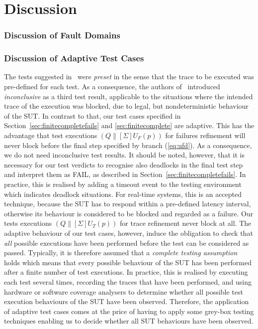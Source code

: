 \section{Discussion}
\label{sec:conc}
\subsubsection*{Discussion of Fault Domains}

\subsubsection*{Discussion of Adaptive Test Cases}
The tests suggested 
in~\cite{Hennessy:1988:ATP:50497,DBLP:conf/icfem/CavalcantiG07} were \emph{preset} in the
sense that the trace to be executed was pre-defined for each test. As a consequence,
the authors of~\cite{DBLP:conf/icfem/CavalcantiG07} introduced \emph{inconclusive}
as a third test result, applicable to the situations where the intended trace
of the execution was blocked, due to legal, but nondeterministic behaviour of the
SUT. In contrast to that, 
our test cases
specified in Section~\ref{sec:finitecompletefails} and \ref{sec:finitecomplete} are
adaptive. This has the advantage that test executions $(Q\parallel[\Sigma] U_F(p))$
for failures refinement
will never block before the final step specified by branch (\ref{eq:ufd}). As
a consequence, we do not need inconclusive test results. It should be noted, however,
that it is necessary for our test verdicts to recognise also deadlocks in the final
test step and interpret 
them as FAIL, as described in Section~\ref{sec:finitecompletefails}. In practice,
this is realised by adding a timeout event to the testing environment which indicates
deadlock situations. For real-time systems, this is an accepted technique, because
the SUT has to respond within a pre-defined latency interval, otherwise its behaviour 
is considered to be blocked and regarded as a failure. Our tests executions 
$(Q\parallel[\Sigma] U_T(p))$ for trace refinement never block at all. The adaptive       
behaviour of our test cases, however, induce the obligation to check that {\it all}
possible executions have been performed before the test can be considered as passed.
Typically, it is therefore assumed that a 
\emph{complete testing assumption}~\cite{hierons_testing_2004} holds which means that
every possible behaviour of the SUT has been performed after a finite number of
test executions. 
In practice, this is realised by executing each test several times, 
recording the traces that have been performed, and using hardware or software coverage 
analysers to determine whether all possible test execution behaviours of the SUT
have been observed. Therefore, the application of adaptive test cases comes at the price
of having to apply some grey-box testing techniques enabling us to decide whether
all SUT behaviours have been observed.


